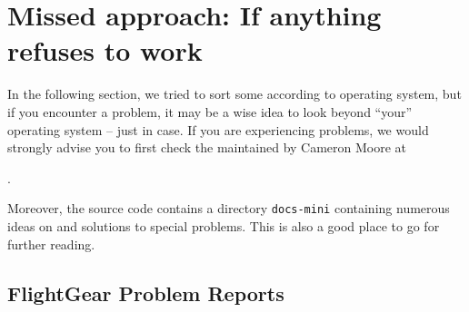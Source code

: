 
\chapter{Missed approach: If anything refuses to work \label{missed}}

In the following section, we tried to sort some  according to operating system,
but if you encounter a problem, it may be a wise idea to look beyond ``your'' operating system -- just in case. If you are experiencing problems, we would strongly advise you to first check the  maintained by Cameron Moore at
\medskip

.
\medskip


Moreover, the source code contains a directory \texttt{docs-mini} containing numerous
ideas on and solutions to special problems. This is also a good place to go for further reading.

\section{FlightGear Problem Reports}

